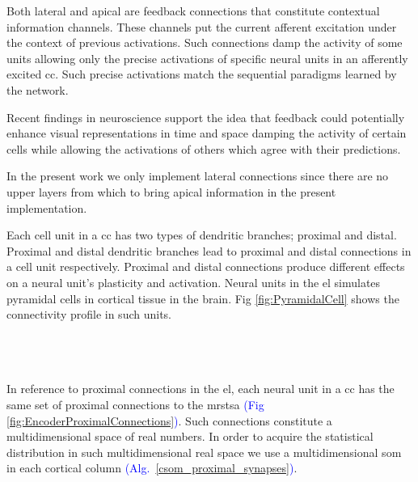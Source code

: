 \documentclass[10pt,letterpaper]{article}
\begin{document}
\pagebreak


Both lateral and apical are feedback connections that constitute contextual information channels. 
These channels put the current afferent excitation under the context of previous activations.
Such connections damp the activity of some units allowing only the precise activations
of specific neural units in an afferently excited \gls{cc}.
Such precise activations match the sequential paradigms learned by the network.

Recent findings in neuroscience \cite{Marques2018} support the idea 
that feedback could potentially enhance visual representations in time and space
damping the activity of certain cells while allowing the activations  of others
which agree with their predictions.

In the present work we only implement lateral connections since
there are no upper layers 
from which to bring apical information in the present implementation.

Each cell unit in a \gls{cc} has two types of dendritic branches; proximal and distal.
Proximal and distal dendritic branches lead to proximal and distal connections in a cell unit respectively.
Proximal and distal connections produce different effects on a neural unit's plasticity and activation.
Neural units in the \gls{el} simulates pyramidal cells in cortical tissue in the brain.
Fig \ref{fig:PyramidalCell} shows the connectivity profile in such units. 

~\\
~\\
~\\

In reference to proximal connections in the \gls{el}, each neural unit in a \gls{cc} has the same set of
proximal connections to the \gls{mrstsa} \textcolor{blue}{(Fig \ref{fig:EncoderProximalConnections})}.
Such connections constitute a multidimensional space of real numbers.
In order to acquire the statistical distribution in such multidimensional real space we use
a multidimensional \gls{som} in each cortical column \textcolor{blue}{(Alg.~\ref{csom_proximal_synapses})}.
\end{document}
